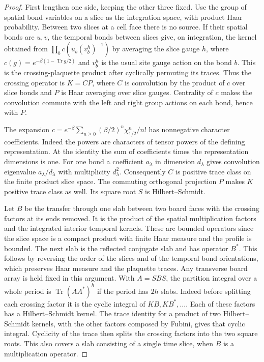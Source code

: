 \documentclass[11pt,letterpaper,reqno]{amsart}
\numberwithin{equation}{section}
\theoremstyle{definition}
\theoremstyle{remark}
\begin{document}
\begin{proof}
First lengthen one side, keeping the other three fixed. Use the
group of spatial bond variables on a slice as the integration
space, with product Haar probability. Between two slices at a
cell face there is no source. If their spatial bonds are $u,v$,
the temporal bonds between slices give, on integration, the
kernel obtained from
$\prod_b c(u_b (v_b^h)^{-1})$ by averaging the slice gauge
$h$, where $c(g)=e^{-\beta(1-\operatorname{Tr}g/2)}$ and
$v_b^h$ is the usual site gauge action on the bond $b$.
This is the crossing-plaquette product after cyclically
permuting its traces. Thus the crossing operator is $K=CP$,
where $C$ is convolution by the product of $c$ over slice bonds
and $P$ is Haar averaging over slice gauges. Centrality of $c$
makes the convolution commute with the left and right group
actions on each bond, hence with $P$.

The expansion
$c=e^{-\beta}\sum_{n\ge0}(\beta/2)^n\chi_{1/2}^n/n!$
has nonnegative character coefficients. Indeed the powers
are characters of tensor powers of the defining representation.
At the identity the sum of coefficients times the representation
dimensions is one. For one bond a coefficient $a_\lambda$ in
dimension $d_\lambda$ gives convolution eigenvalue
$a_\lambda/d_\lambda$ with multiplicity $d_\lambda^2$.
Consequently $C$ is positive trace class on the finite product
slice space. The commuting orthogonal projection $P$ makes
$K$ positive trace class as well. Its square root $S$ is
Hilbert--Schmidt.

Let $B$ be the transfer through one slab between two board
faces with the crossing factors at its ends removed. It is the
product of the spatial multiplication factors and the integrated
interior temporal kernels. These are bounded operators since the
slice space is a compact product with finite Haar measure and
the profile is bounded. The next slab is the reflected
conjugate slab and has operator $B^*$. This follows by reversing
the order of the slices and of the temporal bond orientations,
which preserves Haar measure and the plaquette traces. Any
transverse board array is held fixed in this argument. With
$A=SBS$, the partition integral over a whole period is
$\operatorname{Tr}(AA^*)^h$ if the period has $2h$ slabs.
Indeed before splitting each crossing factor it is the
cyclic integral of $KB,KB^*,\ldots$. Each of these factors has a
Hilbert--Schmidt kernel. The trace identity for a product of two
Hilbert--Schmidt kernels, with the other factors composed by
Fubini, gives that cyclic integral. Cyclicity of the trace then
splits the crossing factors into the two square roots. This
also covers a slab consisting of a single time slice, when $B$
is a multiplication operator.


\end{proof}
\end{document}
